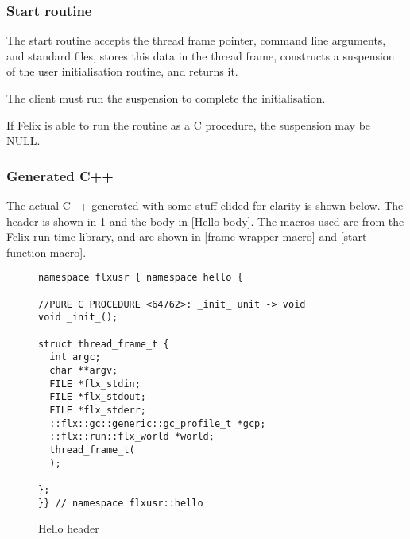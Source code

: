 \documentclass[oneside]{book}
\begin{document}
\subsubsection{Start routine}
The start routine accepts the thread frame pointer,
command line arguments, and standard files, stores
this data in the thread frame, constructs a suspension
of the user initialisation routine, and returns it.

The client must run the suspension to complete the initialisation.

If Felix is able to run the routine as a C procedure, the suspension
may be NULL.

\subsubsection{Generated C++}
The actual C++ generated with some stuff elided for clarity is shown below.
The header is shown in \ref{Hello header} and the body in \ref{Hello body}.
The macros used are from the Felix run time library, and are
shown in \ref{frame wrapper macro}
and \ref{start function macro}.


\begin{figure}[p]
\caption{Hello header\label{Hello header}}
\begin{verbatim}
namespace flxusr { namespace hello {

//PURE C PROCEDURE <64762>: _init_ unit -> void
void _init_();

struct thread_frame_t {
  int argc;
  char **argv;
  FILE *flx_stdin;
  FILE *flx_stdout;
  FILE *flx_stderr;
  ::flx::gc::generic::gc_profile_t *gcp;
  ::flx::run::flx_world *world;
  thread_frame_t(
  );

};
}} // namespace flxusr::hello
\end{verbatim}
\end{figure}
\end{document}
